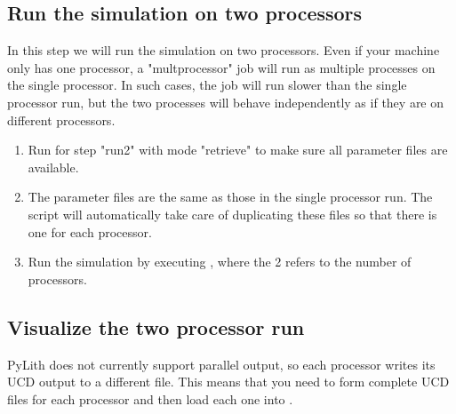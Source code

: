 \subsection{Run the simulation on two processors}

In this step we will run the simulation on two processors. Even if
your machine only has one processor, a "multprocessor" job will run as
multiple processes on the single processor. In such cases, the job
will run slower than the single processor run, but the two processes
will behave independently as if they are on different processors.

\begin{enumerate}
\item Run  for step "run2" with mode "retrieve" to
  make sure all parameter files are available.

  \begin{screen}
    \shellprompt{}
  \end{screen}
  
\item The parameter files are the same as those in the single
  processor run. The  script will automatically take
  care of duplicating these files so that there is one for each
  processor.
\item Run the simulation by executing , where
  the 2 refers to the number of processors.

  \begin{screen}
    \shellprompt{}
  \end{screen}
\end{enumerate}

\subsection{Visualize the two processor run}

PyLith does not currently support parallel output, so each processor
writes its UCD output to a different file. This means that you need to
form complete UCD files for each processor and then load each one into
.


